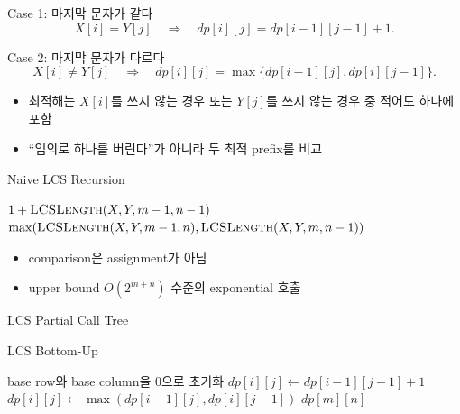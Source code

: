 \begin{frame}{Case 1: 마지막 문자가 같다}
\[
X[i]=Y[j]\quad\Longrightarrow\quad dp[i][j]=dp[i-1][j-1]+1.
\]
\centering{}
\end{frame}
\begin{frame}{Case 2: 마지막 문자가 다르다}
\[
X[i]\ne Y[j]\quad\Longrightarrow\quad
dp[i][j]=\max\{dp[i-1][j],dp[i][j-1]\}.
\]
\begin{itemize}\item 최적해는 $X[i]$를 쓰지 않는 경우 또는 $Y[j]$를 쓰지 않는 경우 중 적어도 하나에 포함\item “임의로 하나를 버린다”가 아니라 두 최적 prefix를 비교\end{itemize}
\end{frame}
\begin{frame}{Naive LCS Recursion}
\algofont\begin{algorithmic}[1]
\State{}\EndIf
{}\State\Return $1+\Call{LCSLength}{X,Y,m-1,n-1}$\EndIf
\State\Return $\max(\Call{LCSLength}{X,Y,m-1,n},\Call{LCSLength}{X,Y,m,n-1})$
\EndProcedure
\end{algorithmic}
\begin{itemize}\item comparison은 assignment가 아님\item upper bound $O(2^{m+n})$ 수준의 exponential 호출\end{itemize}
\end{frame}
\begin{frame}{LCS Partial Call Tree}
\centering{}
\end{frame}
\begin{frame}{LCS Bottom-Up}
\small\begin{algorithmic}[1]
\State base row와 base column을 0으로 초기화
\State $dp[i][j]\gets dp[i-1][j-1]+1$
\Else\State $dp[i][j]\gets\max(dp[i-1][j],dp[i][j-1])$\EndIf
\EndFor\EndFor
\State\Return $dp[m][n]$
\end{algorithmic}
\end{frame}
